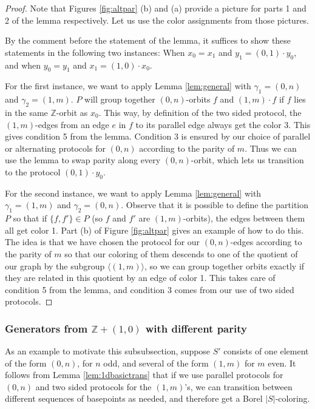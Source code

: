 \documentclass[12pt]{article}
\newcommand{\0}{\varnothing}
\newcommand{\Z}{\mathbb{Z}}
\begin{document}
\begin{proof}
Note that Figures \ref{fig:altpar} (b) and (a) provide a picture for parts 1 and 2 of the lemma respectively. Let us use the color assignments from those pictures.

By the comment before the statement of the lemma, it suffices to show these statements in the following two instances: When $x_0 = x_1$ and $y_1 = (0,1) \cdot y_0$, and when $y_0 = y_1$ and $x_1 = (1,0) \cdot x_0$.

For the first instance, we want to apply Lemma \ref{lem:general} with $\gamma_1 = (0,n)$ and $\gamma_2 = (1,m)$. $P$ will group together $(0,n)$-orbits $f$ and $(1,m) \cdot f$ if $f$ lies in the same $\Z$-orbit as $x_0$. This way, by definition of the two sided protocol, the $(1,m)$-edges from an edge $e$ in $f$ to its parallel edge always get the color 3. This gives condition 5 from the lemma. Condition 3 is ensured by our choice of parallel or alternating protocols for $(0,n)$ according to the parity of $m$. Thus we can use the lemma to swap parity along every $(0,n)$-orbit, which lets us transition to the protocol $(0,1) \cdot y_0$.

For the second instance, we want to apply Lemma \ref{lem:general} with $\gamma_1 = (1,m)$ and $\gamma_2 = (0,n)$. Observe that it is possible to define the partition $P$ so that if $\{f,f'\} \in P$ (so $f$ and $f'$ are $(1,m)$-orbits), the edges between them all get color 1. Part (b) of Figure \ref{fig:altpar} gives an example of how to do this. The idea is that we have chosen the protocol for our $(0,n)$-edges according to the parity of $m$ so that our coloring of them descends to one of the quotient of our graph by the subgroup $\langle (1,m) \rangle$, so we can group together orbits exactly if they are related in this quotient by an edge of color 1. This takes care of condition 5 from the lemma, and condition 3 comes from our use of two sided protocols.
\end{proof}

\subsubsection{Generators from $\Z + (1,0)$ with different parity}

As an example to motivate this subsubsection, suppose $S'$ consists of one element of the form $(0,n)$, for $n$ odd, and several of the form $(1,m)$ for $m$ even. It follows from Lemma \ref{lem:1dbasictrans} that if we use parallel protocols for $(0,n)$ and two sided protocols for the $(1,m)$'s, we can transition between different sequences of basepoints as needed, and therefore get a Borel $|S|$-coloring. 
\end{document}
